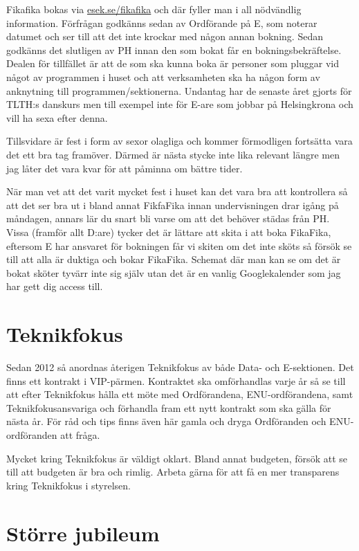 \documentclass[10pt]{article}
\begin{document}
    Fikafika bokas via \url{esek.se/fikafika} och där fyller man i all nödvändlig information. Förfrågan godkänns sedan av Ordförande på E, som noterar datumet och ser till att det inte krockar med någon annan bokning. Sedan godkänns det slutligen av PH innan den som bokat får en bokningsbekräftelse. Dealen för tillfället är att de som ska kunna boka är personer som pluggar vid något av programmen i huset och att verksamheten ska ha någon form av anknytning till programmen/sektionerna. Undantag har de senaste året gjorts för TLTH:s danskurs men till exempel inte för E-are som jobbar på Helsingkrona och vill ha sexa efter denna.
    
    Tillsvidare är fest i form av sexor olagliga och kommer förmodligen fortsätta vara det ett bra tag framöver. Därmed är nästa stycke inte lika relevant längre men jag låter det vara kvar för att påminna om bättre tider.

    När man vet att det varit mycket fest i huset kan det vara bra att kontrollera så att det ser bra ut i bland annat FikfaFika innan undervisningen drar igång på måndagen, annars lär du snart bli varse om att det behöver städas från PH. Vissa (framför allt D:are) tycker det är lättare att skita i att boka FikaFika, eftersom E har ansvaret för bokningen får vi skiten om det inte sköts så försök se till att alla är duktiga och bokar FikaFika. Schemat där man kan se om det är bokat sköter tyvärr inte sig själv utan det är en vanlig Googlekalender som jag har gett dig access till.
    
    \section{Teknikfokus}
    
    Sedan 2012 så anordnas återigen Teknikfokus av både Data- och E-sektionen. Det finns ett kontrakt i VIP-pärmen. Kontraktet ska omförhandlas varje år så se till att efter Teknikfokus hålla ett möte med Ordförandena, ENU-ordförandena, samt Teknikfokusansvariga och förhandla fram ett nytt kontrakt som ska gälla för nästa år. För råd och tips finns även här gamla och dryga Ordföranden och ENU-ordföranden att fråga.
    
    Mycket kring Teknikfokus är väldigt oklart. Bland annat budgeten, försök att se till att budgeten är bra och rimlig. Arbeta gärna för att få en mer transparens kring Teknikfokus i styrelsen.
    
    \section{Större jubileum}
    
\end{document}
